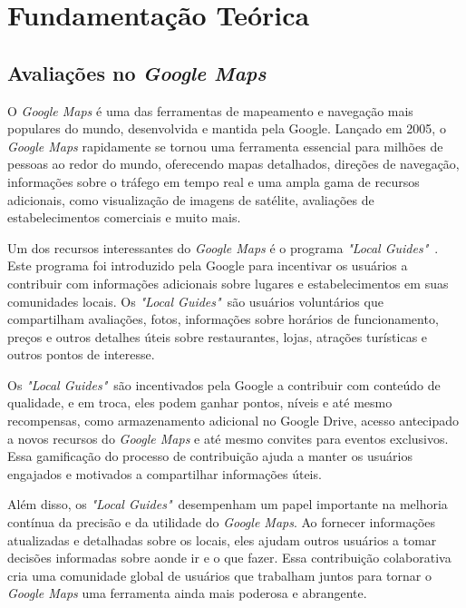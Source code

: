 \chapter{Fundamentação Teórica}
\label{cap:fund_teorica}

\section{Avaliações no \textit{Google Maps}}
\label{cap:fund_teorica:sec:google_maps}

O \textit{Google Maps} \cite{wiki:googlemaps2023} é uma das ferramentas de mapeamento e navegação mais populares do mundo, desenvolvida e mantida pela Google. Lançado em 2005, o \textit{Google Maps} rapidamente se tornou uma ferramenta essencial para milhões de pessoas ao redor do mundo, oferecendo mapas detalhados, direções de navegação, informações sobre o tráfego em tempo real e uma ampla gama de recursos adicionais, como visualização de imagens de satélite, avaliações de estabelecimentos comerciais e muito mais.

Um dos recursos interessantes do \textit{Google Maps} é o programa \textit{"Local Guides"}~\cite{google2022localguides}. Este programa foi introduzido pela Google para incentivar os usuários a contribuir com informações adicionais sobre lugares e estabelecimentos em suas comunidades locais. Os \textit{"Local Guides"}~são usuários voluntários que compartilham avaliações, fotos, informações sobre horários de funcionamento, preços e outros detalhes úteis sobre restaurantes, lojas, atrações turísticas e outros pontos de interesse.

Os \textit{"Local Guides"}~são incentivados pela Google a contribuir com conteúdo de qualidade, e em troca, eles podem ganhar pontos, níveis e até mesmo recompensas, como armazenamento adicional no Google Drive, acesso antecipado a novos recursos do \textit{Google Maps} e até mesmo convites para eventos exclusivos. Essa gamificação do processo de contribuição ajuda a manter os usuários engajados e motivados a compartilhar informações úteis.

Além disso, os \textit{"Local Guides"}~desempenham um papel importante na melhoria contínua da precisão e da utilidade do \textit{Google Maps}. Ao fornecer informações atualizadas e detalhadas sobre os locais, eles ajudam outros usuários a tomar decisões informadas sobre aonde ir e o que fazer. Essa contribuição colaborativa cria uma comunidade global de usuários que trabalham juntos para tornar o \textit{Google Maps} uma ferramenta ainda mais poderosa e abrangente.

